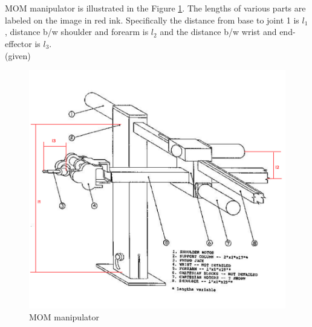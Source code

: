 \documentclass[12pt]{article}
\newcommand{\given}{{\\ \color{blue} \hspace*{\fill}(given)} \\}
\begin{document}
\section{}
MOM manipulator is illustrated in the Figure \ref{fig:q3.1}.
The lengths of various parts are labeled on the image in red ink.
Specifically the distance from base to joint 1 is $l_1$, distance b/w shoulder and forearm is $l_2$ and the distance b/w wrist and end-effector is $l_3$.
\given
\begin{figure}[h]
  \centering
  \includegraphics[width=1\textwidth]{q3.png}
  \caption{MOM manipulator}
  \label{fig:q3.1}
\end{figure}
\end{document}

